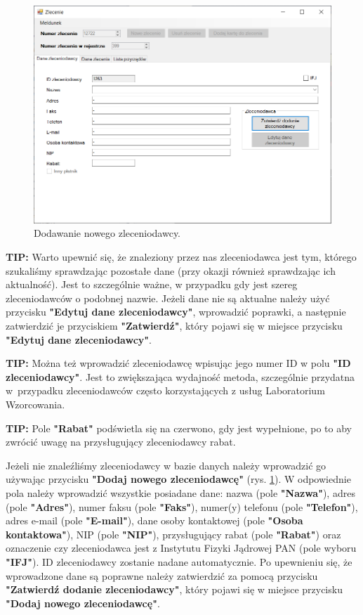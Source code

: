 \begin{figure}[htb]
	\centering
	\includegraphics[width=\columnwidth]{obrazki/Biuro/zlecenie/zlecenie_dodanie_zleceniodawcy.png}
	\caption{Dodawanie nowego zleceniodawcy.}
	\label{zlecenieDodanieZleceniodawcy}
\end{figure}

\textbf{TIP:} Warto upewnić się, że znaleziony przez nas zleceniodawca jest tym, którego szukaliśmy sprawdzając pozostałe dane (przy okazji również sprawdzając ich aktualność). Jest to szczególnie ważne, w przypadku gdy jest szereg zleceniodawców o podobnej nazwie. Jeżeli dane nie są aktualne należy użyć przycisku \textbf{"Edytuj dane zleceniodawcy"}, wprowadzić poprawki, a następnie zatwierdzić je przyciskiem \textbf{"Zatwierdź"}, który pojawi się w miejsce przycisku \textbf{"Edytuj dane zleceniodawcy"}.

\textbf{TIP:} Można też wprowadzić zleceniodawcę wpisując jego numer ID w polu \textbf{"ID zleceniodawcy"}. Jest to zwiększająca wydajność metoda, szczególnie przydatna w~przypadku zleceniodawców często korzystających z usług Laboratorium Wzorcowania.

\textbf{TIP:} Pole \textbf{"Rabat"} podświetla się na czerwono, gdy jest wypełnione, po to aby zwrócić uwagę na przysługujący zleceniodawcy rabat.

Jeżeli nie znaleźliśmy zleceniodawcy w bazie danych należy wprowadzić go używając przycisku \textbf{"Dodaj nowego zleceniodawcę"} (rys. \ref{zlecenieDodanieZleceniodawcy}). W odpowiednie pola należy wprowadzić wszystkie posiadane dane: nazwa (pole \textbf{"Nazwa"}), adres (pole \textbf{"Adres"}), numer faksu (pole \textbf{"Faks"}), numer(y) telefonu (pole \textbf{"Telefon"}), adres e-mail (pole \textbf{"E-mail"}), dane osoby kontaktowej (pole \textbf{"Osoba kontaktowa"}), NIP (pole \textbf{"NIP"}), przysługujący rabat (pole \textbf{"Rabat"}) oraz oznaczenie czy zleceniodawca jest z Instytutu Fizyki Jądrowej PAN (pole wyboru  \textbf{"IFJ"}). ID zleceniodawcy zostanie nadane automatycznie. Po upewnieniu się, że wprowadzone dane są poprawne należy zatwierdzić za pomocą przycisku \textbf{"Zatwierdź dodanie zleceniodawcy"}, który pojawi się w miejsce przycisku \textbf{"Dodaj nowego zleceniodawcę"}.

